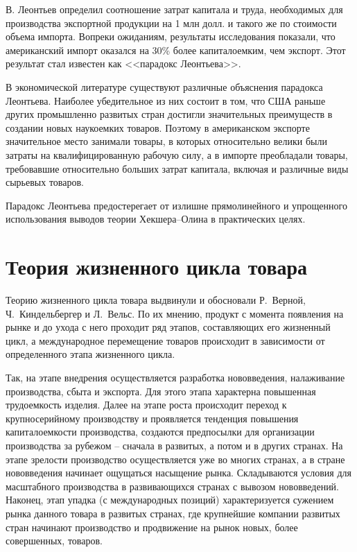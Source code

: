В. Леонтьев определил соотношение затрат капитала и труда, необходимых для
производства экспортной продукции на 1 млн долл. и такого же по стоимости
объема импорта. Вопреки ожиданиям, результаты исследования показали, что
американский импорт оказался на 30\% более капиталоемким, чем экспорт. Этот
результат стал известен как <<парадокс Леонтьева>>.

В экономической литературе существуют различные объяснения парадокса Леонтьева.
Наиболее убедительное из них состоит в том, что США раньше других промышленно
развитых стран достигли значительных преимуществ в создании новых наукоемких
товаров. Поэтому в американском экспорте значительное место занимали товары, в
которых относительно велики были затраты на квалифицированную рабочую силу, а в
импорте преобладали товары, требовавшие относительно больших затрат капитала,
включая и различные виды сырьевых товаров.

Парадокс Леонтьева предостерегает от излишне прямолинейного и упрощенного
использования выводов теории Хекшера--Олина в практических целях.

\vspace*{2em} %

\section{Теория жизненного цикла товара}

Теорию жизненного цикла товара выдвинули и обосновали Р.~Верной,
Ч.~Киндельбергер и Л.~Вельс. По их мнению, продукт с момента появления на рынке
и до ухода с него проходит ряд этапов, составляющих его жизненный цикл, а
международное перемещение товаров происходит в зависимости от определенного
этапа жизненного цикла.

Так, на этапе внедрения осуществляется разработка нововведения, налаживание
производства, сбыта и экспорта. Для этого этапа характерна повышенная
трудоемкость изделия. Далее на этапе роста происходит переход к крупносерийному
производству и проявляется тенденция повышения капиталоемкости производства,
создаются предпосылки для организации производства за рубежом -- сначала в
развитых, а потом и в других странах. На этапе зрелости производство
осуществляется уже во многих странах, а в стране нововведения начинает
ощущаться насыщение рынка. Складываются условия для масштабного производства в
развивающихся странах с вывозом нововведений. Наконец, этап упадка (с
международных позиций) характеризуется сужением рынка данного товара в развитых
странах, где крупнейшие компании развитых стран начинают производство и
продвижение на рынок новых, более совершенных, товаров.

